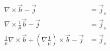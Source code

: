 \begin{displaymath}
    \begin{split}
    \nabla \times \vec{h} - \vec{j} &= \vec{j}_s \\
    \nabla \times \frac{1}{\mu} \vec{b} - \vec{j} &= \vec{j}_s \\
    \frac{1}{\mu} \nabla \times \vec{b} + \left(\nabla \frac{1}{\mu}\right) \times \vec{b} - \vec{j} &= \vec{j}_s
    \end{split}
\label{eq:permeability-derivation}
\end{displaymath}
